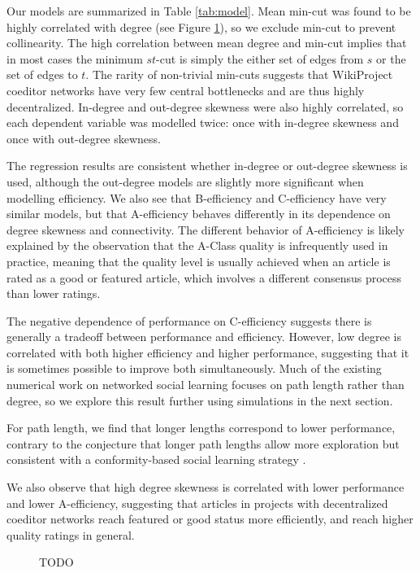 \documentclass[10pt,twocolumn]{article}
\newcommand{\+}{\phantom{-}}
\begin{document}
Our models are summarized in Table \ref{tab:model}.
Mean min-cut was found to be highly correlated with degree (see Figure \ref{fig:degree-mincut}),
so we exclude min-cut to prevent collinearity.
The high correlation between mean degree and min-cut implies that in most cases
the minimum $st$-cut is simply the either set of edges from $s$ or the set of edges to $t$.
The rarity of non-trivial min-cuts suggests that WikiProject coeditor networks have very few central
bottlenecks and are thus highly decentralized.
In-degree and out-degree skewness were also highly correlated, so each dependent variable was modelled twice:
once with in-degree skewness and once with out-degree skewness.

The regression results are consistent whether in-degree or out-degree skewness is used,
although the out-degree models are slightly more significant when modelling efficiency.
We also see that B-efficiency and C-efficiency have very similar models, but that A-efficiency behaves
differently in its dependence on degree skewness and connectivity.
The different behavior of A-efficiency is likely explained by the observation that the A-Class quality is
infrequently used in practice, meaning that the quality level is usually achieved when an article is rated
as a good or featured article, which involves a different consensus process than lower ratings.

The negative dependence of performance on C-efficiency suggests there is generally a tradeoff between
performance and efficiency.
However, low degree is correlated with both higher efficiency and higher performance,
suggesting that it is sometimes possible to improve both simultaneously.
Much of the existing numerical work on networked social learning focuses on path length rather than degree,
so we explore this result further using simulations in the next section.

For path length, we find that longer lengths correspond to lower performance, contrary to the conjecture
that longer path lengths allow more exploration \cite{mason_propagation_2008}
but consistent with a conformity-based social learning strategy \cite{barkoczi_social_2016}.

We also observe that high degree skewness is correlated with lower performance and lower A-efficiency,
suggesting that articles in projects with decentralized coeditor networks reach featured or good status
more efficiently, and reach higher quality ratings in general.

\begin{figure}
\caption{
TODO
\label{fig:degree-mincut}
}
\end{figure}
\end{document}
